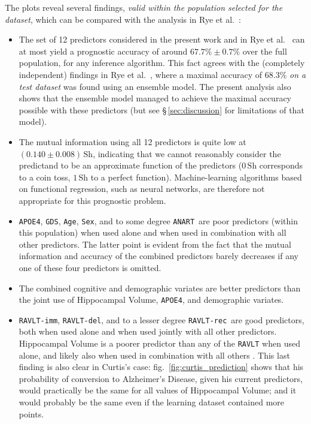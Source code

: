 \documentclass[a4paper,12pt,%
onecolumn,oneside,article,%
british%
]{memoir}
\theoremstyle{remark}
\theoremstyle{innote}
\renewcommand*{\|}[1][]{\nonscript\:#1\vert\nonscript\:\mathopen{}}
\newcommand*{\sect}{\S}%
\newcommand*{\fig}{fig.}%
\newcommand*{\etal}{{et al.}}
\newcommand*{\age}{\texttt{Age}}
\newcommand*{\sex}{\texttt{Sex}}
\newcommand*{\apoe}{\texttt{APOE4}}
\newcommand*{\anart}{\texttt{ANART}}
\newcommand*{\gds}{\texttt{GDS}}
\newcommand*{\ravltimm}{\texttt{RAVLT-imm}}
\newcommand*{\ravltdel}{\texttt{RAVLT-del}}
\newcommand*{\ravltrec}{\texttt{RAVLT-rec}}
\newcommand*{\ad}{Alzheimer's Disease}
\begin{document}
The plots reveal several findings, \emph{valid within the population selected for the dataset}, which can be compared with the analysis in Rye \etal\ \autocites[see especially Fig.~3 and Table~3]{ryeetal2022}:
\begin{itemize}
\item The set of 12 predictors considered in the present work and in Rye \etal\ \autocites{ryeetal2022} can at most yield a prognostic accuracy of around $67.7\%\pm0.7\%$ over the full population, for any inference algorithm. This fact agrees with the (completely independent) findings in Rye \etal\ \autocites{ryeetal2022}, where a maximal accuracy of 68.3\% \emph{on a test dataset} was found using an ensemble model. The present analysis also shows that the ensemble model managed to achieve the maximal accuracy possible with these predictors (but see \sect\,\ref{sec:discussion} for limitations of that model).

\item The mutual information using all 12 predictors is quite low at $(0.140\pm 0.008)\,\mathrm{Sh}$, indicating that we cannot reasonably consider the predictand to be an approximate function of the predictors ($0\,\mathrm{Sh}$ corresponds to a coin toss, $1\,\mathrm{Sh}$ to a perfect function). Machine-learning algorithms based on functional regression, such as neural networks, are therefore not appropriate for this prognostic problem.

\item \apoe, \gds, \age, \sex, and to some degree \anart\   are poor predictors (within this population) when used alone and when used in combination with all other predictors. The latter point is evident from the fact that the mutual information and accuracy of the combined predictors barely decreases if any one of these four predictors is omitted.

\item The combined cognitive and demographic variates are better predictors than the joint use of Hippocampal Volume, \apoe, and demographic variates.

\item \ravltimm, \ravltdel, and to a lesser degree \ravltrec\ are good predictors, both when used alone and when used jointly with all other predictors. Hippocampal Volume is a poorer predictor than any of the \texttt{RAVLT} when used alone, and likely also when used in combination with all others \autocites[contrast this with][]{ryeetal2022}. 
This last finding is also clear in Curtis's case: \fig~\ref{fig:curtis_prediction} shows that his probability of conversion to \ad, given his current predictors, would practically be the same for all values of Hippocampal Volume; and it would probably be the same even if the learning dataset contained more points.
\end{itemize}
\end{document}
